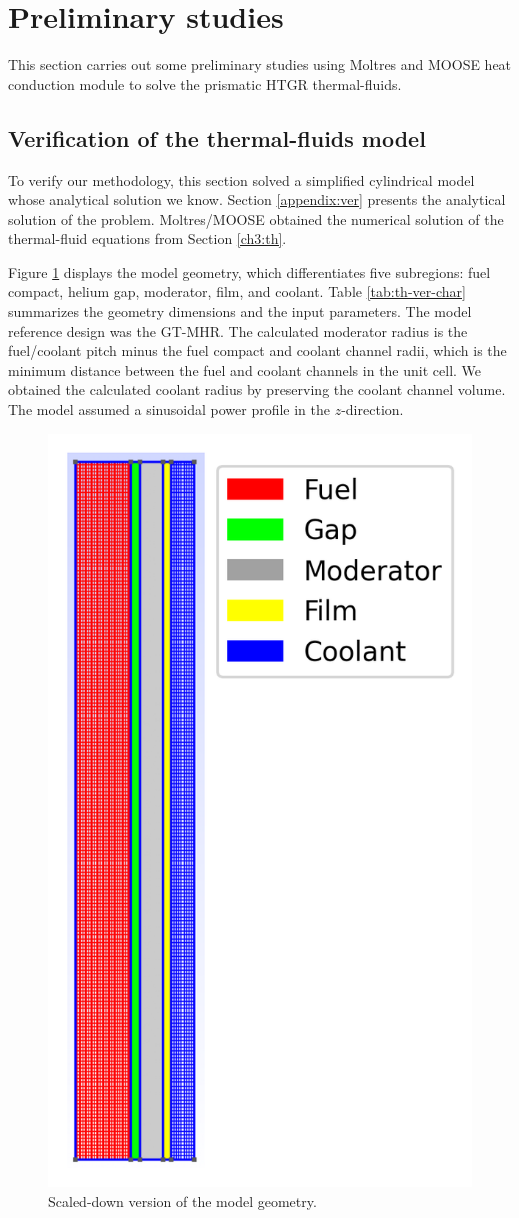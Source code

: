 \section{Preliminary studies}

This section carries out some preliminary studies using Moltres and MOOSE heat conduction module to solve the prismatic HTGR thermal-fluids.

\subsection{Verification of the thermal-fluids model}

To verify our methodology, this section solved a simplified cylindrical model whose analytical solution we know.
Section \ref{appendix:ver} presents the analytical solution of the problem.
Moltres/MOOSE obtained the numerical solution of the thermal-fluid equations from Section \ref{ch3:th}.

Figure \ref{fig:th-ver-mesh} displays the model geometry, which differentiates five subregions: fuel compact, helium gap, moderator, film, and coolant.
Table \ref{tab:th-ver-char} summarizes the geometry dimensions and the input parameters.
The model reference design was the GT-MHR.
The calculated moderator radius is the fuel/coolant pitch minus the fuel compact and coolant channel radii, which is the minimum distance between the fuel and coolant channels in the unit cell.
We obtained the calculated coolant radius by preserving the coolant channel volume.
The model assumed a sinusoidal power profile in the $z$-direction.

\begin{figure}[htbp!]
	\centering
	\includegraphics[width=0.25\linewidth]{figures-thermal/2D-preliminar-mesh2}
	\hfill
	\caption{Scaled-down version of the model geometry.}
	\label{fig:th-ver-mesh}
\end{figure}

